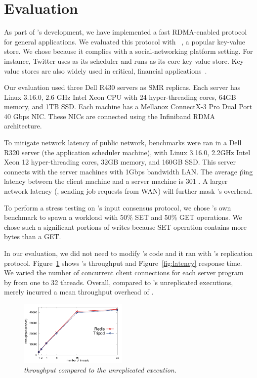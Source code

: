 \section{Evaluation} \label{sec:eval}

As part of \xxx's development, we have implemented a fast RDMA-enabled \paxos 
protocol~\cite{falcon:github} for general applications. We evaluated this 
protocol with \redis~\cite{redis}, a popular key-value store. We chose \redis 
because it complies with a social-networking platform setting. For instance, 
Twitter uses \mesos as its scheduler and runs \redis as its core key-value 
store. Key-value stores are also widely used 
in critical, financial applications~\cite{nosql:finance,nosql:racs14}.

Our evaluation used three Dell R430 servers as SMR replicas. Each server has 
Linux 3.16.0, 2.6 GHz Intel Xeon CPU with 24 hyper-threading cores, 64GB 
memory, and 1TB SSD. Each machine has a Mellanox ConnectX-3 Pro Dual Port 40 
Gbps NIC. These NICs are connected using the Infiniband RDMA architecture.

To mitigate network latency of public network, benchmarks were ran 
in a Dell R320 server (the application scheduler machine), with Linux 3.16.0, 
2.2GHz Intel Xeon 12 hyper-threading cores, 32GB memory, and 160GB SSD. This 
server connects with the server machines with 1Gbps bandwidth LAN. The average 
\v{ping} latency between the client machine and a server machine is 301 \us. A 
larger network latency (\eg, sending job requests from WAN) will further 
mask \xxx's overhead.

To perform a stress testing on \xxx's input consensus protocol, we chose 
\redis's own benchmark to spawn a workload with 50\% SET and 50\% GET 
operations. We chose such a significant portions of writes because SET 
operation contains more bytes than a GET.

In our evaluation, we did not need to modify \redis's code and it ran with 
\xxx's replication protocol. Figure~\ref{fig:tput} shows \xxx's throughput and 
Figure~\ref{fig:latency} response time. We varied the number of concurrent 
client connections for each server program by from one to 32 threads. Overall, 
compared to \redis's unreplicated executions, \xxx merely incurred a mean 
throughput overhead of \tputoverhead.

\begin{figure}[h]
\centering
\includegraphics[width=0.47\textwidth]{figures/throughput}
\caption{\small {\em \xxx throughput compared to the unreplicated 
execution.}}
\label{fig:tput}
\end{figure}
 
